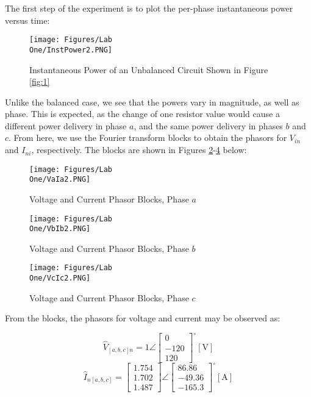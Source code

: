 \documentclass[
	letterpaper, %
	10pt, %
]{CSUniSchoolLabReport}
\begin{document}
The first step of the experiment is to plot the per-phase instantaneous power versus time:

  \begin{figure}[H]
    \centering
    \texttt{[image: Figures/Lab\\ One/InstPower2.PNG]}
    \caption{Instantaneous Power of an Unbalanced Circuit Shown in Figure \ref{fig:1}}
    \label{fig:7}
  \end{figure}

  Unlike the balanced case, we see that the powers vary in magnitude, as well as phase. This is expected, as the change of one resistor value would cause a different power delivery in phase $a$, and the same power delivery in phases $b$ and $c$. From here, we use the Fourier transform blocks to obtain the phasors for $V_{in}$ and $I_{ni}$, respectively. The blocks are shown in Figures \ref{fig:8}-\ref{fig:10} below:

  \begin{multicols}{3}

    \begin{figure}[H]
      \centering
      \texttt{[image: Figures/Lab\\ One/VaIa2.PNG]}
      \caption{Voltage and Current Phasor Blocks, Phase $a$}
      \label{fig:8}
    \end{figure}

    \begin{figure}[H]
      \centering
      \texttt{[image: Figures/Lab\\ One/VbIb2.PNG]}
      \caption{Voltage and Current Phasor Blocks, Phase $b$}
      \label{fig:9}
    \end{figure}

    \begin{figure}[H]
      \centering
      \texttt{[image: Figures/Lab\\ One/VcIc2.PNG]}
      \caption{Voltage and Current Phasor Blocks, Phase $c$}
      \label{fig:10}
    \end{figure}
  \end{multicols}

  From the blocks, the phasors for voltage and current may be observed as:

  $$\hat{V}_{[a,b,c]n}=1\angle\left[ \begin{matrix} 0\\-120\\120 \end{matrix}\right]^{\circ}[\si{\volt}]$$
  $$\hat{I}_{n[a,b,c]}=\left[ \begin{matrix}1.754\\1.702\\1.487 \end{matrix} \right]\angle\left[ \begin{matrix} 86.86\\-49.36\\-165.3 \end{matrix}\right]^{\circ}[\si{\ampere}]$$
\end{document}
